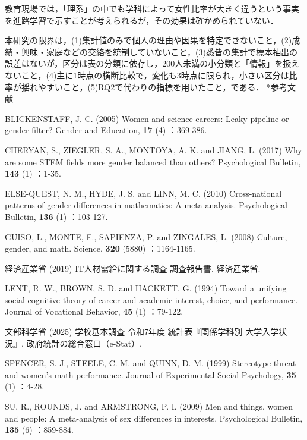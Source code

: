 \documentclass[a4paper,10pt,twocolumn]{ltjsarticle}
\makeatletter
\renewcommand{\section}{\@startsection{section}{1}{\z@}{1.1\Cvs \@plus.4\Cdp \@minus.2\Cdp}{.5\Cvs \@plus.2\Cdp}{\normalfont\gtfamily\bfseries\large}}
\makeatother
\begin{document}
教育現場では，「理系」の中でも学科によって女性比率が大きく違うという事実を進路学習で示すことが考えられるが，その効果は確かめられていない．

本研究の限界は，(1)集計値のみで個人の理由や因果を特定できないこと，(2)成績・興味・家庭などの交絡を統制していないこと，(3)悉皆の集計で標本抽出の誤差はないが，区分は表の分類に依存し，200人未満の小分類と「情報」を扱えないこと，(4)主に1時点の横断比較で，変化も3時点に限られ，小さい区分は比率が揺れやすいこと，(5)RQ2で代わりの指標を用いたこと，である．
\section*{参考文献}
\begingroup\scriptsize\raggedright{} 
\begin{list}{}{\setlength{\leftmargin}{1.5\zw}\setlength{\itemindent}{-1.5\zw}\setlength{\labelwidth}{0pt}\setlength{\labelsep}{0pt}\setlength{\itemsep}{1pt}\setlength{\parsep}{0pt}\setlength{\topsep}{0pt}\setlength{\listparindent}{0pt}}
\item BLICKENSTAFF, J. C. (2005) Women and science careers: Leaky pipeline or gender filter? Gender and Education, \textbf{17} (4) ：369-386.
\item CHERYAN, S., ZIEGLER, S. A., MONTOYA, A. K. and JIANG, L. (2017) Why are some STEM fields more gender balanced than others? Psychological Bulletin, \textbf{143} (1) ：1-35.
\item ELSE-QUEST, N. M., HYDE, J. S. and LINN, M. C. (2010) Cross-national patterns of gender differences in mathematics: A meta-analysis. Psychological Bulletin, \textbf{136} (1) ：103-127.
\item GUISO, L., MONTE, F., SAPIENZA, P. and ZINGALES, L. (2008) Culture, gender, and math. Science, \textbf{320} (5880) ：1164-1165.
\item 経済産業省 (2019) IT人材需給に関する調査 調査報告書. 経済産業省.
\item LENT, R. W., BROWN, S. D. and HACKETT, G. (1994) Toward a unifying social cognitive theory of career and academic interest, choice, and performance. Journal of Vocational Behavior, \textbf{45} (1) ：79-122.
\item 文部科学省 (2025) 学校基本調査 令和7年度 統計表『関係学科別 大学入学状況』. 政府統計の総合窓口（e-Stat）.
\item SPENCER, S. J., STEELE, C. M. and QUINN, D. M. (1999) Stereotype threat and women's math performance. Journal of Experimental Social Psychology, \textbf{35} (1) ：4-28.
\item SU, R., ROUNDS, J. and ARMSTRONG, P. I. (2009) Men and things, women and people: A meta-analysis of sex differences in interests. Psychological Bulletin, \textbf{135} (6) ：859-884.
\end{list}\endgroup
\end{document}
